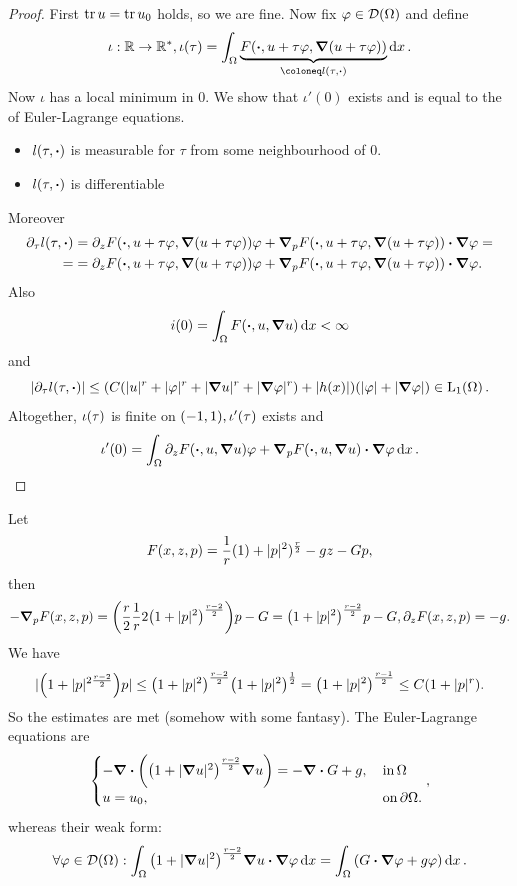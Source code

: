 \documentclass{article}
\begin{document}
\begin{proof}
	First $\tr u = \tr u_0$ holds, so we are fine. Now fix $\varphi \in \mathcal{D}\qty(\Omega)$ and define
	\[
		\iota:\R \to \R^{*}, \iota\qty(\tau) = \int_{\Omega}\underbrace{F\qty(\vdot, u + \tau \varphi, \grad \qty(u+ \tau \varphi))}_{\coloneq l\qty(\tau, \vdot)}\dd{x}.
	\]
	Now $\iota$ has a local minimum in $0$. We show that $\iota'(0)$ exists and is equal to the of Euler-Lagrange equations. 
	\begin{itemize}
		\item $l\qty(\tau, \vdot)$ is measurable for $\tau$ from some neighbourhood of $0$.
		\item $l\qty(\tau, \vdot)$ is differentiable
	\end{itemize}
	Moreover
	\begin{align*}
		\partial_{\tau}l\qty(\tau, \vdot) &= \partial_{z}F\qty(\vdot, u+\tau \varphi, \grad\qty(u+\tau \varphi))\varphi + \grad_p F\qty(\vdot, u+\tau \varphi, \grad\qty(u+\tau \varphi))\vdot \grad \varphi =\\ =
						  & = \partial_{z}F\qty(\vdot, u+\tau \varphi, \grad \qty(u+\tau \varphi))\varphi + \grad_p F\qty(\vdot, u+\tau \varphi, \grad\qty(u+\tau \varphi))\vdot \grad \varphi.
	\end{align*}
	Also
	\[
		i(0) = \int_{\Omega}F\qty(\vdot, u, \grad u)\dd{x} < \infty
	\]
	and
	\[
		|\partial_{\tau} l(\tau, \vdot)| \leq (C(|u|^r+|\varphi|^r+|\grad u|^r + |\grad \varphi|^r)+|h(x)|)(|\varphi|+|\grad \varphi|) \in \LpSet[1]{\Omega}.
	\]
	Altogether, $\iota\qty(\tau)$ is finite on $(-1,1), \iota'\qty(\tau)$ exists and
	\[
		\iota'\qty(0) = \int_{\Omega}\partial_{z}F\qty(\vdot, u, \grad u)\varphi + \grad_p F\qty(\vdot, u, \grad u) \vdot \grad \varphi\dd{x}.
	\]
\end{proof}

\begin{example}
	Let
	\[
		F\qty(x,z,p) = \frac{1}{r}\qty(1)+|p|^{2})^{\frac{r}{2}} - gz - Gp,
	\]
	then
	\[
		- \grad_p F\qty(x,z,p) = \qty(\frac{r}{2}\frac{1}{r} 2 \qty(1+|p|^{2})^{\frac{r-2}{2}})p -G = \qty(1+|p|^{2})^{\frac{r-2}{2}}p-G, \partial_{z}F\qty(x,z,p) = -g.
	\]
	We have
	\[
		|\qty(1+|p|^{2\frac{r-2}{2}})p| \leq \qty(1+|p|^{2})^{\frac{r-2}{2}}\qty(1+|p|^{2})^{\frac{1}{2}} = \qty(1+|p|^{2})^{\frac{r-1}{2}}\leq C\qty(1+|p|^r).
	\]
	So the estimates are met (somehow with some fantasy).
	The Euler-Lagrange equations are
	\[
		\begin{cases}
			- \divergence{\qty(\qty(1+|\grad u|^{2})^{\frac{r-2}{2}}\grad u)} = - \divergence{G} + g, & \, \text{in} \, \Omega\\
			u = u_0, & \, \text{on} \, \partial \Omega.
		\end{cases},
	\]
	whereas their weak form:
	\[
		\forall \varphi \in \mathcal{D}\qty(\Omega):\int_{\Omega}\qty(1+|\grad u|^{2})^{\frac{r-2}{2}}\grad u \vdot \grad \varphi\dd{x} = \int_{\Omega}\qty(G \vdot \grad\varphi + g \varphi) \dd{x}.
	\]
\end{example}
\end{document}
